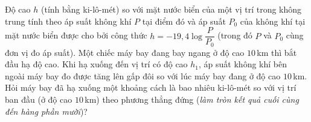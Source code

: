 \begin{ex}%
	Độ cao $h$ (tính bằng ki-lô-mét) so với mặt nước biển của một vị trí trong không trung tính theo áp suất không khí $P$ tại điểm đó và áp suất $P_0$ của không khí tại mặt nước biển được cho bởi công thức $h=-19{,}4 \log \dfrac{P}{P_0}$ (trong đó $P$ và $P_0$ cùng đơn vị đo áp suất). Một chiếc máy bay đang bay ngang ở độ cao $10$\,km thì bắt đầu hạ độ cao. Khi hạ xuống đến vị trí có độ cao $h_1$, áp suất không khí bên ngoài máy bay đo được tăng lên gấp đôi so với lúc máy bay đang ở độ cao $10$\,km. Hỏi máy bay đã hạ xuống một khoảng cách là bao nhiêu ki-lô-mét so với vị trí ban đầu (ở độ cao $10$\,km) theo phương thẳng đứng ({\it làm tròn kết quả cuối cùng đến hàng phần mười})?
	\par
\end{ex}

